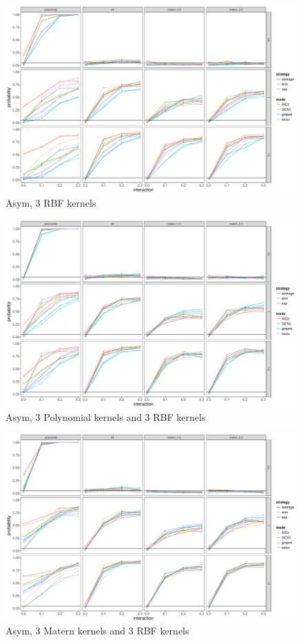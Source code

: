 \documentclass[11pt]{article}
\begin{document}
\begin{figure}
\begin{center}
\includegraphics[width=0.9\columnwidth]{A3} 
\caption{Asym, 3 RBF kernels}
\label{fig:res}
\end{center}
\end{figure}

\begin{figure}
\begin{center}
\includegraphics[width=0.9\columnwidth]{A4} 
\caption{Asym, 3 Polynomial kernels and 3 RBF kernels}
\label{fig:res}
\end{center}
\end{figure}

\begin{figure}
\begin{center}
\includegraphics[width=0.9\columnwidth]{A5} 
\caption{Asym, 3 Matern kernels and 3 RBF kernels}
\label{fig:res}
\end{center}
\end{figure}
\end{document}

